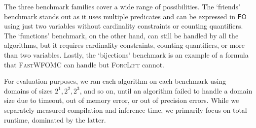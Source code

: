 \documentclass[a4paper,UKenglish,cleveref, autoref, thm-restate]{lipics-v2021}
\newcommand{\FO}{$\mathsf{FO}$}
\newcommand{\UFO}{$\mathsf{UFO}^{2} + \mathsf{CC}$}
\newcommand{\Cranetwo}{\textsc{Gantry}}
\begin{document}


The three benchmark families cover a wide range of possibilities. The
`friends' benchmark stands out as it uses multiple predicates and can be
expressed in \FO{} using just two variables without cardinality constraints or
counting quantifiers. The `functions' benchmark, on the other hand, can still be
handled by all the algorithms, but it requires cardinality constraints, counting
quantifiers, or more than two variables. Lastly, the `bijections' benchmark is
an example of a formula that \textsc{FastWFOMC} can handle but \textsc{ForcLift}
cannot.



For evaluation purposes, we ran each algorithm on each benchmark using domains
of sizes $2^{1}, 2^{2}, 2^{3}$, and so on, until an algorithm failed to handle a
domain size due to timeout, out of memory error, or out of precision errors.
While we separately measured compilation and inference time, we primarily focus
on total runtime, dominated by the latter.




\end{document}
